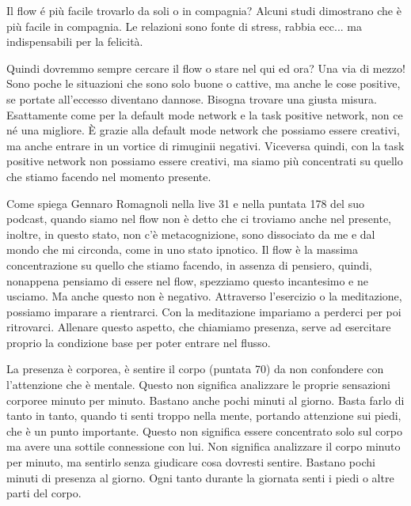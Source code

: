 \documentclass[12pt]{book} %
\begin{document}
\begin{mdframed}[linewidth=1pt]
Il flow é più facile trovarlo da soli o in compagnia? Alcuni studi dimostrano che è più facile in compagnia. Le
relazioni sono fonte di stress, rabbia ecc... ma indispensabili per la felicità.

Quindi dovremmo sempre cercare il flow o stare nel qui ed ora? Una via di mezzo! Sono poche le situazioni che sono solo
buone o cattive, ma anche le cose positive, se portate all'eccesso diventano dannose. Bisogna
trovare una giusta misura. Esattamente come per la default mode network e la task positive network, non ce né una
migliore. È grazie alla default mode network che possiamo essere creativi, ma anche entrare in un vortice di rimuginii
negativi. Viceversa quindi, con la task positive network non possiamo essere creativi, ma siamo più concentrati su
quello che stiamo facendo nel momento presente.

Come spiega Gennaro Romagnoli nella live
31 e nella
puntata 178 del suo podcast, quando siamo nel flow non è detto che ci troviamo anche nel presente, inoltre, in questo stato, non
c'è metacognizione, sono dissociato da me e dal mondo che mi circonda, come in uno stato ipnotico.
Il flow è la massima concentrazione su quello che stiamo facendo, in assenza di pensiero, quindi, nonappena pensiamo di
essere nel flow, spezziamo questo incantesimo e ne usciamo. Ma anche questo non è negativo. Attraverso
l'esercizio o la meditazione, possiamo imparare a rientrarci. Con la meditazione impariamo a
perderci per poi ritrovarci. Allenare questo aspetto, che chiamiamo presenza, serve ad esercitare proprio la condizione
base per poter entrare nel flusso.

La presenza è corporea, è sentire il corpo (puntata
70) da non confondere con
l'attenzione che è mentale. Questo non significa analizzare le proprie sensazioni corporee minuto
per minuto. Bastano anche pochi minuti al giorno. Basta farlo di tanto in tanto, quando ti senti troppo nella mente,
portando attenzione sui piedi, che è un punto importante. Questo non significa essere concentrato solo sul corpo ma
avere una sottile connessione con lui. Non significa analizzare il corpo minuto per minuto, ma sentirlo senza giudicare
cosa dovresti sentire. Bastano pochi minuti di presenza al giorno. Ogni tanto durante la giornata senti i piedi o altre
parti del corpo. 


\end{mdframed}
\end{document}
